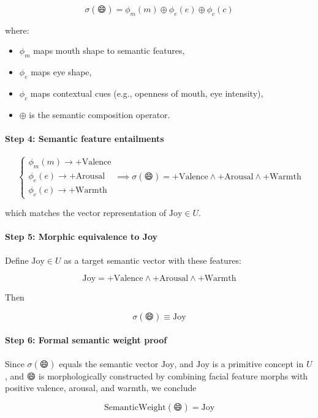 \documentclass{article}
\begin{document}
\[
\sigma(\text{😄}) = \phi_m(m) \oplus \phi_e(e) \oplus \phi_c(c)
\]

where:  
\begin{itemize}
    \item $\phi_m$ maps mouth shape to semantic features,
    \item $\phi_e$ maps eye shape,
    \item $\phi_c$ maps contextual cues (e.g., openness of mouth, eye intensity),
    \item $\oplus$ is the semantic composition operator.
\end{itemize}

\paragraph{Step 4: Semantic feature entailments}

\[
\begin{cases}
\phi_m(m) \to +\mathrm{Valence} \\
\phi_e(e) \to +\mathrm{Arousal} \\
\phi_c(c) \to +\mathrm{Warmth}
\end{cases}
\implies
\sigma(\text{😄}) = +\mathrm{Valence} \wedge +\mathrm{Arousal} \wedge +\mathrm{Warmth}
\]

which matches the vector representation of $\mathrm{Joy} \in U$.

\paragraph{Step 5: Morphic equivalence to Joy}

Define $\mathrm{Joy} \in U$ as a target semantic vector with these features:

\[
\mathrm{Joy} = +\mathrm{Valence} \wedge +\mathrm{Arousal} \wedge +\mathrm{Warmth}
\]

Then

\[
\sigma(\text{😄}) \equiv \mathrm{Joy}
\]

\paragraph{Step 6: Formal semantic weight proof}

Since $\sigma(\text{😄})$ equals the semantic vector $\mathrm{Joy}$, and $\mathrm{Joy}$ is a primitive concept in $U$,  
and $\text{😄}$ is morphologically constructed by combining facial feature morphs with positive valence, arousal, and warmth,  
we conclude

\[
\boxed{
\mathrm{SemanticWeight}(\text{😄}) = \mathrm{Joy}
}
\]
\end{document}

